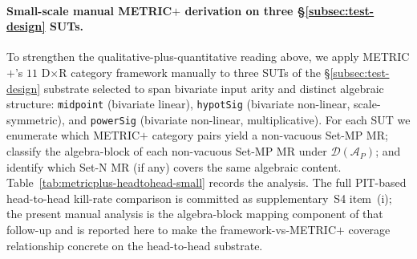 \documentclass[acmsmall, screen]{acmart}
\begin{document}
\paragraph{Small-scale manual METRIC$+$ derivation on three \S\ref{subsec:test-design} SUTs.}
\label{para:metricplus-headtohead-small}
To strengthen the qualitative-plus-quantitative reading above, we apply
METRIC$+$'s $11$ D$\times$R category framework manually to three SUTs of
the \S\ref{subsec:test-design} substrate selected to span bivariate
input arity and distinct algebraic structure: \texttt{midpoint}
(bivariate linear), \texttt{hypotSig} (bivariate non-linear, scale-symmetric),
and \texttt{powerSig} (bivariate non-linear, multiplicative). For each
SUT we enumerate which METRIC$+$ category pairs yield a non-vacuous
Set-MP MR; classify the algebra-block of each non-vacuous Set-MP MR
under $\mathcal{D}(\mathcal{A}_P)$; and identify which Set-N MR (if any)
covers the same algebraic content. Table~\ref{tab:metricplus-headtohead-small}
records the analysis. The full PIT-based head-to-head kill-rate
comparison is committed as supplementary~S4 item~(i); the
present manual analysis is the algebra-block mapping component of
that follow-up and is reported here to make the framework-vs-METRIC$+$
coverage relationship concrete on the head-to-head substrate.
\end{document}
